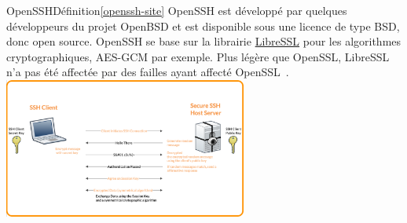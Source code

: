 \documentclass{beamer}
\begin{document}
    \begin{frame}{OpenSSH}{Définition\cref{openssh-site}}
        OpenSSH est développé par quelques développeurs du projet OpenBSD et est disponible sous une licence de type BSD, donc open source.
        \bigbreak
        OpenSSH se base sur la librairie \href{https://www.libressl.org}{LibreSSL} pour les algorithmes cryptographiques, AES-GCM par exemple.
        Plus légère que OpenSSL, LibreSSL n'a pas été affectée par des failles ayant affecté OpenSSL~.
        \bigbreak
        \centering
        \includegraphics[width=8cm]{image/ssh-key-diagram}
    \end{frame}
\end{document}
